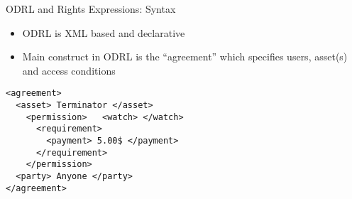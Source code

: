 \documentclass{beamer}
\begin{document}
\begin{frame}[fragile]{ODRL and Rights Expressions: Syntax}
\begin{itemize}
  \item ODRL is XML based and declarative
  \item Main construct in ODRL is the ``agreement'' which specifies users, asset(s) and access conditions
\end{itemize}
\lstset{language=XML}
\begin{lstlisting}[caption={Syntax of an Agreement in ODRL in XML}]
<agreement> 
  <asset> Terminator </asset> 
    <permission>   <watch> </watch>  
      <requirement>   
        <payment> 5.00$ </payment>
      </requirement> 
    </permission> 
  <party> Anyone </party>
</agreement>
\end{lstlisting}
\end{frame}
\end{document}
